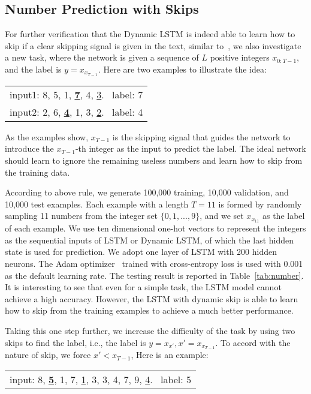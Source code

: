 \documentclass[letterpaper]{article} \usepackage{aaai19}  \usepackage{times}  \usepackage{helvet}  \usepackage{courier}  \usepackage{url}  \usepackage{graphicx}  \usepackage{amsmath}
\begin{document}
\subsection{Number Prediction with Skips}
For further verification that the Dynamic LSTM is indeed able to learn how to skip if a clear skipping signal is given in the text, similar to~\cite{yu2017learning}, we also investigate a new task, where the network is given a sequence of $L$ positive integers $x_{0:T-1}$, and the label is $y=x_{x_{T-1}}$. Here are two examples to illustrate the idea:
\begin{table}[h]
\centering
\begin{tabular}{c}
  input1: 8, 5, 1, \textbf{\underline7}, 4, \underline3. \ label: 7\\
  input2: 2, 6, \textbf{\underline4}, 1, 3, \underline2. \ label: 4
\end{tabular}
\end{table}

As the examples show, $x_{T-1}$ is the skipping signal that guides the network to introduce the $x_{T-1}$-th integer as the input to predict the label. The ideal network should learn to ignore the remaining useless numbers and learn how to skip from the training data.

According to above rule, we generate 100,000 training, 10,000 validation, and 10,000 test examples. Each example with a length $T=11$ is formed by randomly sampling 11 numbers from the integer set $\{0,1,...,9\}$, and we set $x_{x_{11}}$ as the label of each example. We use ten dimensional one-hot vectors to represent the integers as the sequential inputs of LSTM or Dynamic LSTM, of which the last hidden state is used for prediction. We adopt one layer of LSTM with 200 hidden neurons. The Adam optimizer~\cite{kingma2014adam} trained with cross-entropy loss is used with 0.001 as the default learning rate. The testing result is reported in Table~\ref{tab:number}. It is interesting to see that even for a simple task, the LSTM model cannot achieve a high accuracy. However, the LSTM with dynamic skip is able to learn how to skip from the training examples to achieve a much better performance.

Taking this one step further, we increase the difficulty of the task by using two skips to find the label, i.e., the label is $y=x_{x'} , x'=x_{x_{T-1}}$. To accord with the nature of skip, we force $x'<x_{T-1}$, Here is an example:
\begin{table}[h]
\centering
\begin{tabular}{c}
  input: 8, \textbf{\underline5}, 1, 7, \underline1, 3, 3, 4, 7, 9, \underline4. \ label: 5
\end{tabular}
\end{table}
\end{document}
